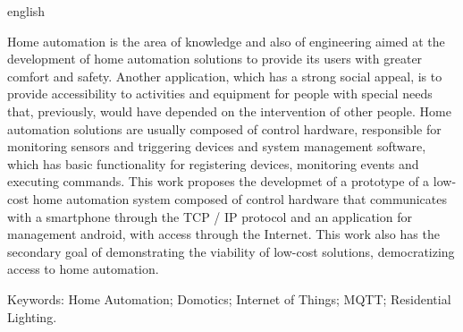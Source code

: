 \documentclass[
12pt,
openany, %
oneside, %
a4paper,			
english,			
brazil			        %
]{abntbibufjf}
\begin{document}
	
	\begin{resumo}[ABSTRACT]
		\begin{otherlanguage*}{english}
			
			Home automation is the area of knowledge and also of engineering aimed at the development of home automation solutions to provide its users with greater comfort and safety. Another application, which has a strong social appeal, is to provide accessibility to activities and equipment for people with special needs that, previously, would have depended on the intervention of other people. Home automation solutions are usually composed of control hardware, responsible for monitoring sensors and triggering devices and system management software, which has basic functionality for registering devices, monitoring events and executing commands. This work proposes the developmet of a prototype of a low-cost home automation system composed of control hardware that communicates with a smartphone through the TCP / IP protocol and an application for management android, with access through the Internet. This work also has the secondary goal of demonstrating the viability of low-cost solutions, democratizing access to home automation. 
			
			

			
			Keywords: Home Automation; Domotics; Internet of Things; MQTT; Residential Lighting.
		\end{otherlanguage*}
	\end{resumo}

	
	
	\listoffigures*
	\cleardoublepage
	
	
	\cleardoublepage
	
\end{document}
